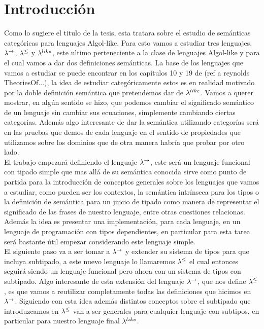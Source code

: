 \chapter{Introducci\'on}
\label{chap:intro}

Como lo sugiere el titulo de la tesis, esta tratara sobre el estudio
de sem\'anticas categ\'oricas para lenguajes Algol-like. Para esto
vamos a estudiar tres lenguajes, $\lambda^{\rightarrow}$, $\lambda^{\leq}$ y $\lambda^{like}$,
este ultimo perteneciente a la clase de lenguajes Algol-like y para el cual
vamos a dar dos definiciones sem\'anticas.
La base de los lenguajes que vamos a estudiar se puede encontrar en los
cap\'itulos 10 y 19 de (ref a reynolds TheoriesOf...), la idea de estudiar
categ\'oricamente estos es en realidad motivado por la doble definici\'on
sem\'antica que pretendemos dar de $\lambda^{like}$. Vamos a querer mostrar, 
en alg\'un sentido se hizo, que podemos cambiar el significado
sem\'antico de un lenguaje sin cambiar sus ecuaciones, simplemente
cambiando ciertas categor\'ias. Adem\'as algo interesante de dar
la sem\'antica utilizando categor\'ias ser\'a en las pruebas que demos 
de cada lenguaje en el sentido de propiedades que utilizamos sobre los
dominios que de otra manera habr\'ia que probar por otro lado.\\

El trabajo empezar\'a definiendo el lenguaje $\lambda^{\rightarrow}$, este ser\'a
un lenguaje funcional con tipado simple que mas allá
de su sem\'antica conocida sirve como punto de partida para la introducci\'on
de conceptos generales sobre los lenguajes que vamos a estudiar, como pueden
ser los contextos, la sem\'antica intr\'inseca para los tipos o la definici\'on
de sem\'antica para un juicio de tipado como manera de representar el significado
de las frases de nuestro lenguaje, entre otras cuestiones relacionas. Adem\'as
la idea es presentar una implementaci\'on, para cada lenguaje, en un 
lenguaje de programaci\'on con tipos dependientes, en particular para esta 
tarea ser\'a bastante \'util empezar considerando este lenguaje simple.\\

El siguiente paso va a ser tomar a $\lambda^{\rightarrow}$ y extender su sistema de 
tipos para que incluya subtipado, a este nuevo lenguaje lo llamaremos
$\lambda^{\leq}$ el cual entonces seguir\'a siendo un lenguaje funcional
pero ahora con un sistema de tipos con subtipado. Algo interesante de
esta extensi\'on del lenguaje $\lambda^{\rightarrow}$, que nos define $\lambda^{\leq}$,
es que vamos a reutilizar completamente todas las definiciones que hicimos
en $\lambda^{\rightarrow}$. Siguiendo con esta idea adem\'as distintos conceptos sobre 
el subtipado que introduzcamos en $\lambda^{\leq}$ van a ser generales para
cualquier lenguaje con subtipos, en particular para nuestro lenguaje final
$\lambda^{like}$.

